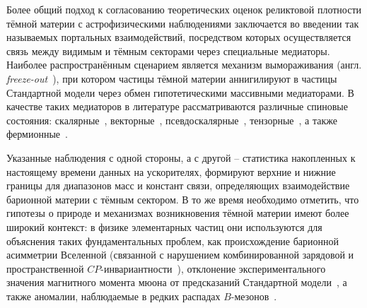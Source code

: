 Более общий подход к согласованию теоретических оценок реликтовой
плотности тёмной материи с астрофизическими наблюдениями заключается
во введении так называемых портальных взаимодействий, посредством
которых осуществляется связь между видимым и тёмным секторами через
специальные медиаторы. Наиболее распространённым сценарием является
механизм вымораживания (англ. \emph{freeze-out}~\cite{freezout-Krnjaic}),
при котором частицы
тёмной материи аннигилируют в частицы Стандартной модели через обмен
гипотетическими массивными медиаторами. В качестве таких медиаторов
в литературе рассматриваются различные спиновые состояния:
скалярные~\cite{scalars-mcdonald},
векторные~\cite{okun1092limits},
псевдоскалярные~\cite{axion-portal-nomura, tsai.axion},
тензорные~\cite{Döbrich2016},
а также фермионные~\cite{nasri-fermion}.

Указанные наблюдения с одной стороны, а с другой -- статистика накопленных
к настоящему времени данных на ускорителях, формируют верхние и нижние
границы для диапазонов масс и констант связи, определяющих взаимодействие
барионной материи с тёмным сектором. В то же время необходимо
отметить, что гипотезы о природе и механизмах возникновения тёмной
материи имеют более широкий контекст: в физике элементарных частиц они
используются для объяснения таких фундаментальных проблем,
как происхождение барионной асимметрии Вселенной (связанной с
нарушением комбинированной зарядовой и пространственной
$CP$-инвариантности~\cite{babar-cp-b-meson, Gninenko:2021}), отклонение
экспериментального значения магнитного
момента мюона от предсказаний Стандартной
модели~\cite{g-2-problem, na64-sieber-g-2-mu}, а также аномалии,
наблюдаемые в редких распадах $B$-мезонов~\cite{babar-cp-b-meson}.



